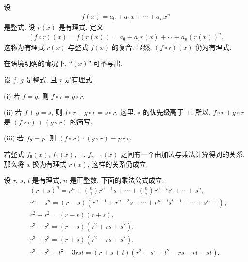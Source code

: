 \begin{definition}
    设
    \begin{align*}
        f(x) = a_0 + a_1 x + \cdots + a_n x^n
    \end{align*}
    是整式. 设 $r(x)$ 是有理式. 定义
    \begin{align*}
        (f \circ r)(x) = f(r(x)) = a_0 + a_1 r(x) + \cdots + a_n (r(x))^n.
    \end{align*}
    这称为有理式 $r(x)$ 与整式 $f(x)$ 的复合. 显然, $(f \circ r)(x)$ 仍为有理式.

    在语境明确的情况下, ``$(x)$'' 可不写出.
\end{definition}

\begin{proposition}
    设 $f$, $g$ 是整式, 且 $r$ 是有理式.

    (i) 若 $f = g$, 则 $f \circ r = g \circ r$.

    (ii) 若 $f + g = s$, 则 $f \circ r + g \circ r = s \circ r$. 这里, $\circ$ 的优先级高于 $+$; 所以, $f \circ r + g \circ r$ 是 $(f \circ r) + (g \circ r)$ 的简写.

    (iii) 若 $fg = p$, 则 $(f \circ r) \cdot (g \circ r) = p \circ r$.
\end{proposition}

\begin{proposition}
    若整式 $f_0 (x)$, $f_1 (x)$, $\cdots$, $f_{n-1} (x)$ 之间有一个由加法与乘法计算得到的关系, 那么将 $x$ 换为有理式 $r(x)$, 这样的关系仍成立.
\end{proposition}

\begin{proposition}
    设 $r$, $s$, $t$ 是有理式, $n$ 是正整数. 下面的乘法公式成立:
    \begin{align*}
         & (r + s)^{n} = r^n + \binom{n}{1} r^{n-1} s + \cdots + \binom{n}{i} r^{n-i} s^i + \cdots + s^n, \\
         & r^n - s^n = (r - s)(r^{n-1} + r^{n-2} s + \cdots + r^{n-i} s^{i-1} + \cdots + s^{n-1}),        \\
         & r^2 - s^2 = (r - s)(r + s),                                                                    \\
         & r^3 - s^3 = (r - s)(r^2 + rs + s^2),                                                           \\
         & r^3 + s^3 = (r + s)(r^2 - rs + s^2),                                                           \\
         & r^3 + s^3 + t^3 - 3rst = (r + s + t)(r^2 + s^2 + t^2 - rs - rt - st).
    \end{align*}
\end{proposition}

